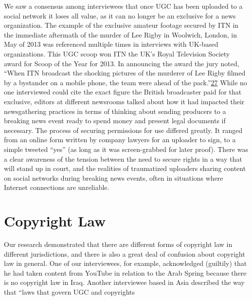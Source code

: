 \documentclass[symmetric, notoc, nobib]{towcenter-book}
\begin{document}
We saw a consensus among interviewees that once UGC has been uploaded
to a social network it loses all value, as it can no longer be an exclusive for
a news organization. The example of the exclusive amateur footage secured
by ITN in the immediate aftermath of the murder of Lee Rigby in Woolwich,
London, in May of 2013 was referenced multiple times in interviews
with UK-based organizations. This UGC scoop won ITN the UK's Royal
Television Society award for Scoop of the Year for 2013. In announcing the
award the jury noted, ``When ITN broadcast the shocking pictures of the
murderer of Lee Rigby filmed by a bystander on a mobile phone, the team
were ahead of the pack.''{\href{#endnotes}{27}} While no one interviewed could cite the exact figure
the British broadcaster paid for that exclusive, editors at different newsrooms
talked about how it had impacted their newsgathering practices in
terms of thinking about sending producers to a breaking news event ready
to spend money and present legal documents if necessary.
The process of securing permissions for use differed greatly. It ranged from
an online form written by company lawyers for an uploader to sign, to a simple
tweeted ``yes'' (as long as it was screen-grabbed for later proof). There
was a clear awareness of the tension between the need to secure rights in a
way that will stand up in court, and the realities of traumatized uploaders
sharing content on social networks during breaking news events, often in
situations where Internet connections are unreliable.
\section{Copyright Law}
Our research demonstrated that there are different forms of copyright law
in different jurisdictions, and there is also a great deal of confusion about
copyright law in general. One of our interviewees, for example, acknowledged
(guiltily) that he had taken content from YouTube in relation to the
Arab Spring because there is no copyright law in Iraq. Another interviewee
based in Asia described the way that ``laws that govern UGC and copyrights
\end{document}
